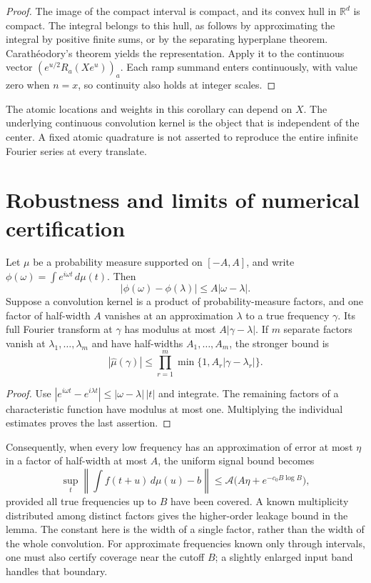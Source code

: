 \begin{proof}
The image of the compact interval is compact, and its convex hull in
$\mathbb R^d$ is compact.  The integral belongs to this hull, as follows
by approximating the integral by positive finite sums, or by the separating
hyperplane theorem.  Carath\'eodory's theorem yields the representation.
Apply it to the continuous vector
$(e^{u/2}R_a(Xe^u))_a$.  Each ramp summand enters continuously, with value
zero when $n=x$, so continuity also holds at integer scales.
\end{proof}

The atomic locations and weights in this corollary can depend on $X$.
The underlying continuous convolution kernel is the object that is
independent of the center.  A fixed atomic quadrature is not asserted to
reproduce the entire infinite Fourier series at every translate.

\section{Robustness and limits of numerical certification}
\label{sec:app-robustness}

\begin{lemma}\label{lem:app-leakage}
Let $\mu$ be a probability measure supported on $[-A,A]$, and write
$\phi(\omega)=\int e^{i\omega t}\,d\mu(t)$.  Then
\[
 |\phi(\omega)-\phi(\lambda)|\le A|\omega-\lambda|.
\]
Suppose a convolution kernel is a product of probability-measure factors,
and one factor of half-width $A$ vanishes at an approximation $\lambda$ to
a true frequency $\gamma$.  Its full Fourier transform at $\gamma$ has
modulus at most $A|\gamma-\lambda|$.  If $m$ separate factors vanish at
$\lambda_1,\ldots,\lambda_m$ and have half-widths $A_1,\ldots,A_m$, the
stronger bound is
\[
 |\widehat\mu(\gamma)|\le
       \prod_{r=1}^m\min\{1,A_r|\gamma-\lambda_r|\}.
\]
\end{lemma}

\begin{proof}
Use $|e^{i\omega t}-e^{i\lambda t}|\le |\omega-\lambda|\,|t|$ and
integrate.  The remaining factors of a characteristic function have
modulus at most one.  Multiplying the individual estimates proves the
last assertion.
\end{proof}

Consequently, when every low frequency has an approximation of error at
most $\eta$ in a factor of half-width at most $A$, the uniform signal
bound becomes
\[
 \sup_t\left\|\int f(t+u)\,d\mu(u)-b\right\|
 \le \mathcal A\bigl(A\eta+e^{-c_0B\log B}\bigr),
\]
provided all true frequencies up to $B$ have been covered.  A known
multiplicity distributed among distinct factors gives the higher-order
leakage bound in the lemma.  The constant here is the width of a single
factor, rather than the width of the whole convolution.  For approximate
frequencies known only through intervals, one must also certify coverage
near the cutoff $B$; a slightly enlarged input band handles that boundary.

